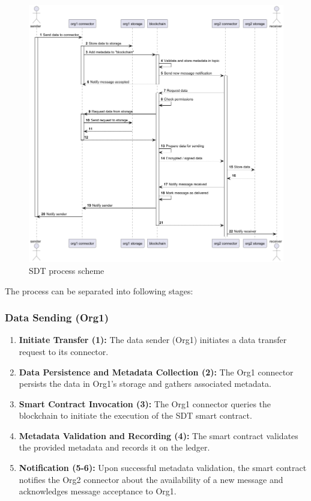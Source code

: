 \documentclass[10pt]{llncs}
\begin{document}
\begin{figure}[ht!]
    \includegraphics[width=\textwidth]{sending_process.png}
    \caption{SDT process scheme} \label{sending_process}
\end{figure}

The process can be separated into following stages:

\subsubsection{Data Sending (Org1)}

\begin{enumerate}
    \item \textbf{Initiate Transfer (1):} The data sender (Org1) initiates a data transfer request to its connector.
    \item \textbf{Data Persistence and Metadata Collection (2):} The Org1 connector persists the data in Org1's storage and gathers associated metadata.
    \item \textbf{Smart Contract Invocation (3):} The Org1 connector queries the blockchain to initiate the execution of the SDT smart contract.
    \item \textbf{Metadata Validation and Recording (4):} The smart contract validates the provided metadata and records it on the ledger.
    \item \textbf{Notification (5-6):} Upon successful metadata validation, the smart contract notifies the Org2 connector about the availability of a new message and acknowledges message acceptance to Org1.
\end{enumerate}
\end{document}
